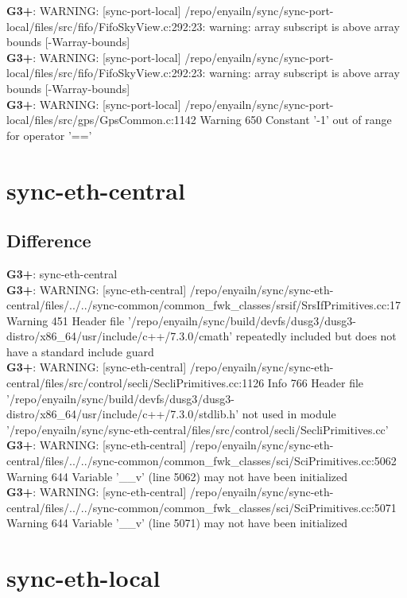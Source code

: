 \documentclass[12pt,twoside]{article}
\begin{document}
\textbf{G3+}: WARNING: [sync-port-local] /repo/enyailn/sync/sync-port-local/files/src/fifo/FifoSkyView.c:292:23: warning: array subscript is above array bounds [-Warray-bounds]\\ 
\textbf{G3+}: WARNING: [sync-port-local] /repo/enyailn/sync/sync-port-local/files/src/fifo/FifoSkyView.c:292:23: warning: array subscript is above array bounds [-Warray-bounds]\\ 
\textbf{G3+}: WARNING: [sync-port-local] /repo/enyailn/sync/sync-port-local/files/src/gps/GpsCommon.c:1142 Warning 650 Constant '-1' out of range for operator '=='\\ 
  
\section{sync-eth-central} 
\subsection{Difference} 
  
\textbf{G3+}: sync-eth-central\\ 
\textbf{G3+}: WARNING: [sync-eth-central] /repo/enyailn/sync/sync-eth-central/files/../../sync-common/common\_fwk\_classes/srsif/SrsIfPrimitives.cc:17 Warning 451 Header file '/repo/enyailn/sync/build/devfs/dusg3/dusg3-distro/x86\_64/usr/include/c++/7.3.0/cmath' repeatedly included but does not have a standard include guard\\ 
\textbf{G3+}: WARNING: [sync-eth-central] /repo/enyailn/sync/sync-eth-central/files/src/control/secli/SecliPrimitives.cc:1126 Info 766 Header file '/repo/enyailn/sync/build/devfs/dusg3/dusg3-distro/x86\_64/usr/include/c++/7.3.0/stdlib.h' not used in module '/repo/enyailn/sync/sync-eth-central/files/src/control/secli/SecliPrimitives.cc'\\ 
\textbf{G3+}: WARNING: [sync-eth-central] /repo/enyailn/sync/sync-eth-central/files/../../sync-common/common\_fwk\_classes/sci/SciPrimitives.cc:5062 Warning 644 Variable '\_\_v' (line 5062) may not have been initialized\\ 
\textbf{G3+}: WARNING: [sync-eth-central] /repo/enyailn/sync/sync-eth-central/files/../../sync-common/common\_fwk\_classes/sci/SciPrimitives.cc:5071 Warning 644 Variable '\_\_v' (line 5071) may not have been initialized\\ 
  
\section{sync-eth-local} 
  
\end{document}
